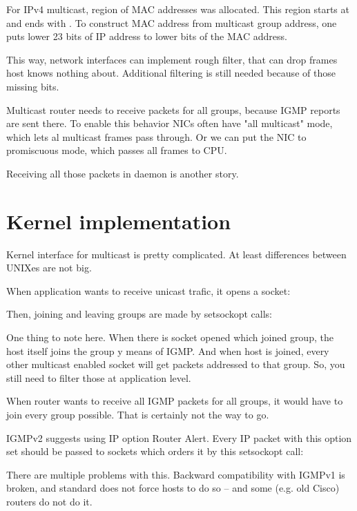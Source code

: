 For IPv4 multicast, region of MAC addresses was allocated. This region starts
at  and ends with . To construct
MAC address from multicast group address, one puts lower 23 bits of IP address
to lower bits of the MAC address.

This way, network interfaces can implement rough filter, that can drop frames
host knows nothing about. Additional filtering is still needed because of those
missing bits.

Multicast router needs to receive packets for all groups, because IGMP reports
are sent there. To enable this behavior NICs often have "all multicast" mode,
which lets al multicast frames pass through. Or we can put the NIC to
promiscuous mode, which passes all frames to CPU.

Receiving all those packets in daemon is another story.

\section{Kernel implementation}

Kernel interface for multicast is pretty complicated. At least differences
between UNIXes are not big.

When application wants to receive unicast trafic, it opens a socket:


\noindent Then, joining and leaving groups are made by setsockopt calls:


One thing to note here. When there is socket opened which joined group, the host
itself joins the group y means of IGMP. And when host is joined, every other
multicast enabled socket will get packets addressed to that group. So, you
still need to filter those at application level.

\noindent When router wants to receive all IGMP packets for all groups, it
would have to join every group possible. That is certainly not the way to go.

IGMPv2 suggests using IP option Router Alert. Every IP packet with this option
set should be passed to sockets which orders it by this setsockopt call:


\noindent There are multiple problems with this. Backward compatibility with IGMPv1 is
broken, and standard does not force hosts to do so -- and some (e.g. old Cisco)
routers do not do it.

